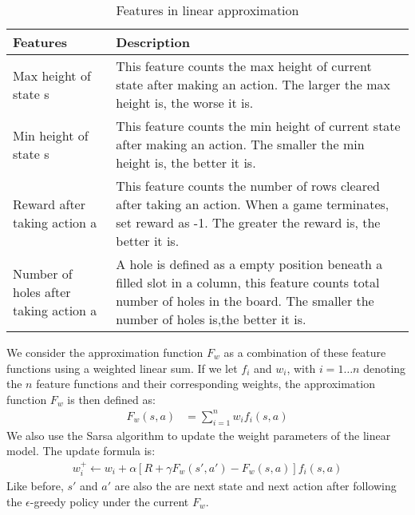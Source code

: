 \documentclass{article}
\begin{document}
\begin{table}
	\centering
    \begin{tabular}{|p{3.5cm}|p{5cm}|}
    \hline
    Features     & Description \\
    \hline
    Max height of state s    & 
    This feature counts the max height of current state
    after making an action. The larger the max height is, the worse it is. \\
    \hline
    Min height of state s & 
    This feature counts the min height of current state
    after making an action. The smaller the min height is, the better it is. \\
    \hline
    Reward after taking action a &
    This feature counts the number of rows cleared after taking an action. When 
    a game terminates, set reward as -1. The greater the reward is, the better it is.\\
    \hline
    Number of holes after taking action a &
    A hole is defined as a empty position beneath a filled slot in a column, this feature 
    counts total number of holes in the board. The smaller the number of holes is,the better it is.\\
    \hline
    \end{tabular}
	\caption{Features in linear approximation}
	\label{table:features}
\end{table}


We consider the approximation function $F_w$ as a combination of these feature functions using a weighted linear sum. If we let $f_i$ and $w_i$, with $i = 1\ldots n$ denoting the $n$ feature functions and their corresponding weights, the approximation function $F_w$ is then defined as:
\begin{align}
	F_w(s,a) &= \sum_{i=1}^{n} w_i f_i(s,a) 
\end{align}
We also use the Sarsa algorithm to update the weight parameters of the linear model. The update formula is:
\begin{align}
	w_i^+ \leftarrow w_i+\alpha\left[R+\gamma F_w(s',a') - F_w(s,a)\right] f_i(s,a)
\end{align}
Like before, $s'$ and $a'$ are also the are next state and next action after following the $\epsilon$-greedy policy under the current $F_w$.
\end{document}

